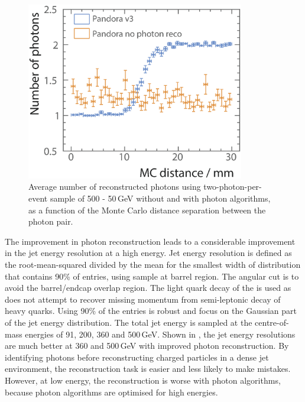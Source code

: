 \begin{figure}[tbph]
\centering
\includegraphics[width=0.85\textwidth]{photon/nPhotonVSnoPhotonReco2}
\caption[Average number of photons using two photons of 500 and 50\,GeV per event sample.]
{Average number of reconstructed  photons using two-photon-per-event sample of 500 - 50\,GeV without and with photon algorithms, as a function of the Monte Carlo distance separation between the photon pair.}
\label{fig:photonDoublePerformanceNoReco}
\end{figure}




The improvement in photon reconstruction leads to a considerable improvement in the jet energy resolution at a high energy. Jet energy resolution is defined as the root-mean-squared divided by the mean for the smallest width of distribution that contains 90\% of entries, using \Zuds sample at barrel region. The angular cut is to avoid the barrel/endcap overlap region. The light quark decay of the \Zprime is used as \pandora does not attempt to recover missing momentum from semi-leptonic decay of heavy quarks. Using 90\% of the entries is robust and focus on the Gaussian part of the jet energy distribution. The total jet energy is sampled at the centre-of-mass energies of 91, 200, 360 and 500\,GeV. Shown in , the jet energy resolutions are much better at 360 and 500\,GeV with improved photon reconstruction. By identifying photons before reconstructing charged particles in a dense jet environment, the reconstruction task is easier and less likely to make mistakes. However, at low energy, the reconstruction is worse with photon algorithms, because photon algorithms are optimised for high energies.

